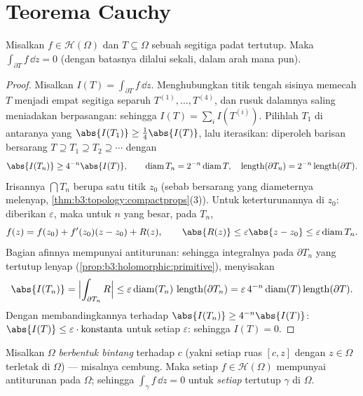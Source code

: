 \section{Teorema Cauchy}

\begin{theorem}[Goursat]\label{thm:b3:holomorphic:goursat}
Misalkan $f \in \mathcal H(\Omega)$ dan $T \subseteq \Omega$ sebuah
segitiga padat tertutup. Maka $\int_{\partial T}f\,\dd z = 0$
(dengan batasnya dilalui sekali, dalam arah mana pun).
\end{theorem}

\begin{proof}
Misalkan $I(T) = \int_{\partial T}f\,\dd z$. Menghubungkan titik tengah
sisinya memecah $T$ menjadi empat segitiga separuh  $T^{(1)},
\dots, T^{(4)}$, dan rusuk dalamnya saling meniadakan berpasangan: sehingga $I(T) =
\sum_iI(T^{(i)})$. Pilihlah $T_1$ di antaranya yang
$\abs{I(T_1)} \geq \frac14\abs{I(T)}$, lalu iterasikan: diperoleh barisan
bersarang $T \supseteq T_1 \supseteq T_2 \supseteq\cdots$ dengan
\[
\abs{I(T_n)} \geq 4^{-n}\abs{I(T)},
\qquad
\operatorname{diam}T_n = 2^{-n}\operatorname{diam}T,
\quad
\operatorname{length}(\partial T_n) =
2^{-n}\operatorname{length}(\partial T).
\]
Irisannya $\bigcap T_n$ berupa satu titik $z_0$
(sebab  bersarang yang diameternya melenyap,
\cref{thm:b3:topology:compactprops}(3)). Untuk keterturunannya di
$z_0$: diberikan $\varepsilon$, maka untuk $n$ yang besar, pada $T_n$,
\[
f(z) = f(z_0) + f'(z_0)(z - z_0) + R(z),
\qquad \abs{R(z)} \leq \varepsilon\abs{z - z_0} \leq
\varepsilon\operatorname{diam}T_n .
\]
Bagian afinnya mempunyai antiturunan: sehingga integralnya pada
$\partial T_n$ yang tertutup lenyap (\cref{prop:b3:holomorphic:primitive}),
menyisakan
\[
\abs{I(T_n)} = \Bigl|\int_{\partial T_n}R\Bigr|
\leq \varepsilon\operatorname{diam}(T_n)\,
\operatorname{length}(\partial T_n)
= \varepsilon\,4^{-n}\operatorname{diam}(T)
\operatorname{length}(\partial T) .
\]
Dengan membandingkannya terhadap $\abs{I(T_n)} \geq 4^{-n}\abs{I(T)}$:
$\abs{I(T)} \leq \varepsilon\cdot\text{konstanta}$ untuk setiap
$\varepsilon$: sehingga $I(T) = 0$.
\end{proof}

\begin{theorem}
\label{thm:b3:holomorphic:cauchy}
Misalkan $\Omega$ \emph{berbentuk bintang} terhadap $c$ (yakni setiap ruas
$[c, z]$ dengan $z \in \Omega$ terletak di $\Omega$) --- misalnya cembung.
Maka setiap $f \in \mathcal H(\Omega)$ mempunyai antiturunan pada $\Omega$;
sehingga $\int_\gamma f\,\dd z = 0$ untuk \emph{setiap}
 tertutup $\gamma$ di $\Omega$.
\end{theorem}

